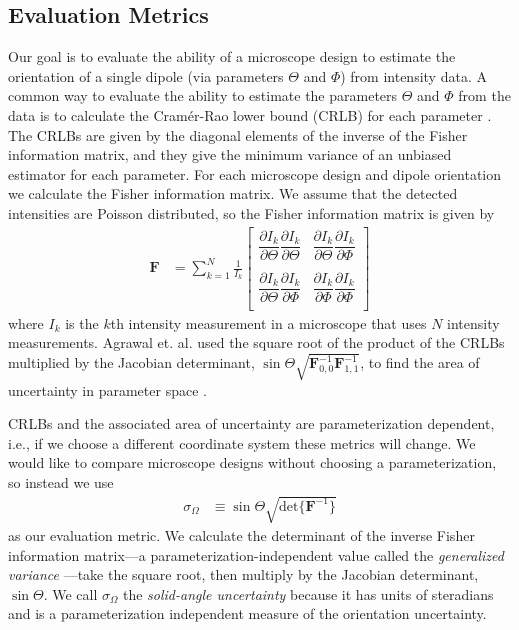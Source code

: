 \documentclass[10pt]{article}
\providecommand{\mb}[1]{\mathbf{#1}}
\begin{document}
\subsection{Evaluation Metrics}\label{metrics}
Our goal is to evaluate the ability of a microscope design to estimate the
orientation of a single dipole (via parameters $\Theta$ and $\Phi$) from
intensity data. A common way to evaluate the ability to estimate the parameters
$\Theta$ and $\Phi$ from the data is to calculate the Cram\'er-Rao lower bound
(CRLB) for each parameter \cite{kay1993}. The CRLBs are given by the diagonal
elements of the inverse of the Fisher information matrix, and they give the
minimum variance of an unbiased estimator for each parameter. For each
microscope design and dipole orientation we calculate the Fisher information
matrix. We assume that the detected intensities are Poisson distributed, so the
Fisher information matrix is given by
\begin{align}
  \mb{F} &= \sum_{k=1}^N \frac{1}{I_k}
  \begin{bmatrix}
    \dfrac{\partial I_k}{\partial \Theta}\dfrac{\partial I_k}{\partial \Theta}&\dfrac{\partial I_k}{\partial \Theta}\dfrac{\partial I_k}{\partial \Phi}\\\\
    \dfrac{\partial I_k}{\partial \Theta}\dfrac{\partial I_k}{\partial \Phi}&\dfrac{\partial I_k}{\partial \Phi}\dfrac{\partial I_k}{\partial \Phi}\\    
  \end{bmatrix}
\end{align}
where $I_k$ is the $k$th intensity measurement in a microscope that uses $N$
intensity measurements. Agrawal et. al. used the square root of the product of
the CRLBs multiplied by the Jacobian determinant,
$\sin\Theta\sqrt{\mb{F}^{-1}_{0,0}\mb{F}^{-1}_{1,1}}$, to find the area of
uncertainty in parameter space \cite{agrawal2012}.

CRLBs and the associated area of uncertainty are parameterization dependent,
i.e., if we choose a different coordinate system these metrics will change. We
would like to compare microscope designs without choosing a parameterization, so
instead we use
\begin{align}
  \sigma_{\Omega} &\equiv \sin\Theta\sqrt{\text{det}\{\mb{F}^{-1}\}}
\end{align}
as our evaluation metric. We calculate the determinant of the inverse Fisher
information matrix---a parameterization-independent value called the
\emph{generalized variance} \cite{anderson1958}---take the square root, then
multiply by the Jacobian determinant, $\sin\Theta$. We call $\sigma_{\Omega}$
the \emph{solid-angle uncertainty} because it has units of steradians and is a
parameterization independent measure of the orientation uncertainty.
\end{document}
